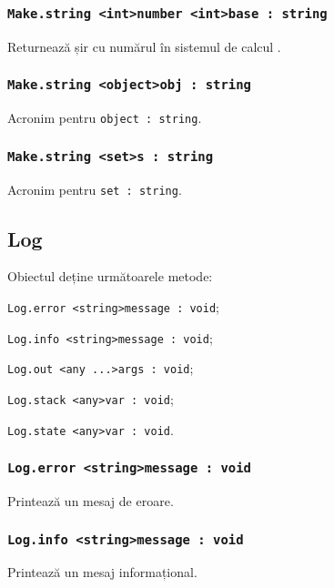 \subsubsection{\lstinline|Make.string <int>number <int>base : string|}

Returnează șir cu numărul  în sistemul de calcul .

\subsubsection{\lstinline|Make.string <object>obj : string|}

Acronim pentru \lstinline|object : string|.

\subsubsection{\lstinline|Make.string <set>s : string|}

Acronim pentru \lstinline|set : string|.

\subsection{{\color{orange} Log}}

Obiectul \logtype{} deține următoarele metode:
\begin{icItems}
	\item \lstinline|Log.error <string>message : void|;
	\item \lstinline|Log.info <string>message : void|;
	\item \lstinline|Log.out <any ...>args : void|;
	\item \lstinline|Log.stack <any>var : void|;
	\item \lstinline|Log.state <any>var : void|.
\end{icItems}

\subsubsection{\lstinline|Log.error <string>message : void|}

Printează un mesaj de eroare.

\subsubsection{\lstinline|Log.info <string>message : void|}

Printează un mesaj informațional.


